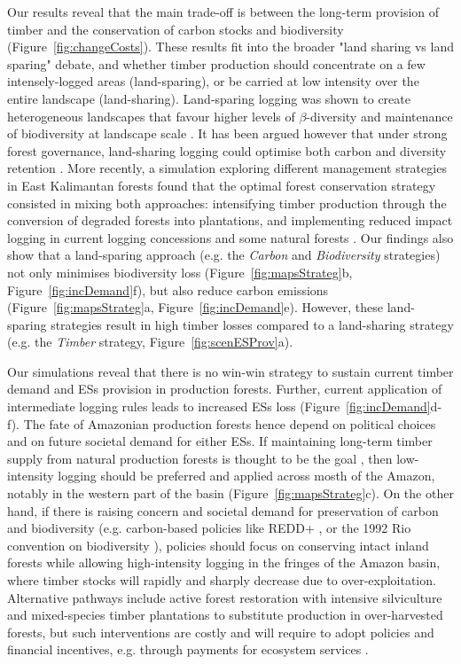 \documentclass{article}
\begin{document}
Our results reveal that the main trade-off is between the long-term provision of timber and the conservation of carbon stocks and biodiversity (Figure~\ref{fig:changeCosts}). These results fit into the broader "land sharing vs land sparing" debate, and whether timber production should concentrate on a few intensely-logged areas (land-sparing), or be carried at low intensity over the entire landscape (land-sharing). 
Land-sparing logging was shown to create heterogeneous landscapes that favour higher levels of $\beta$-diversity and maintenance of biodiversity at landscape scale \cite{DeCastroSolar2015,Edwards2014}. 
It has been argued however that under strong forest governance, land-sharing logging could optimise both carbon and diversity retention \cite{Griscom2018}. 
More recently, a simulation exploring different management strategies in East Kalimantan forests found that the optimal forest conservation strategy consisted in mixing both approaches: intensifying timber production through the conversion of degraded forests into plantations, and implementing reduced impact logging in current logging concessions and some natural forests \cite{Runting2018}. 
Our findings also show that a land-sparing approach (e.g. the \textit{Carbon} and \textit{Biodiversity} strategies) not only minimises biodiversity loss (Figure~\ref{fig:mapsStrateg}b, Figure~\ref{fig:incDemand}f), but also reduce carbon emissions (Figure~\ref{fig:mapsStrateg}a, Figure~\ref{fig:incDemand}e). 
However, these land-sparing strategies result in high timber losses compared to a land-sharing strategy (e.g. the \textit{Timber} strategy, Figure~\ref{fig:scenESProv}a). 

Our simulations reveal that there is no win-win strategy to sustain current timber demand and ESs provision in production forests. Further, current application of intermediate logging rules leads to increased ESs loss (Figure~\ref{fig:incDemand}d-f). The fate of Amazonian production forests hence depend on political choices and on future societal demand for either ESs. If maintaining long-term timber supply from natural production forests is thought to be the goal \cite{Zarin2007}, then low-intensity logging should be preferred and applied across mosth of the Amazon, notably in the western part of the basin (Figure~\ref{fig:mapsStrateg}c).
On the other hand, if there is raising concern and societal demand for preservation of carbon and biodiversity (e.g. carbon-based policies like REDD+ \cite{Stickler2009}, or the 1992 Rio convention on biodiversity \cite{Barton1992}), policies should focus on conserving intact inland forests while allowing high-intensity logging in the fringes of the Amazon basin, where timber stocks will rapidly and sharply decrease due to over-exploitation. Alternative pathways include active forest restoration with intensive silviculture and mixed-species timber plantations \cite{Lamb2005} to substitute production in over-harvested forests, but such interventions are costly and will require to adopt policies and financial incentives, e.g. through payments for ecosystem services \cite{Salzman2018}.
\end{document}
